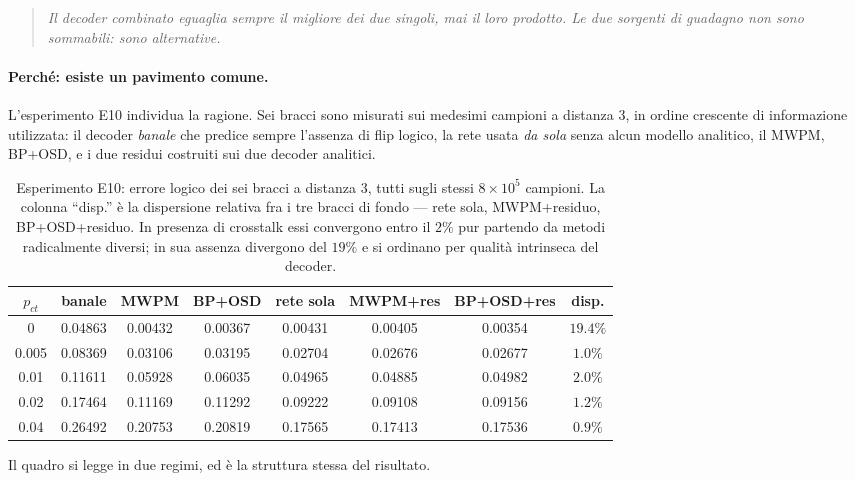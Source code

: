 \begin{quote}
\emph{Il decoder combinato eguaglia sempre il migliore dei due singoli, mai il loro prodotto. Le due sorgenti di guadagno non sono sommabili: sono alternative.}
\end{quote}

\paragraph{Perché: esiste un pavimento comune.}
L'esperimento E10 individua la ragione. Sei bracci sono misurati sui medesimi campioni a distanza 3, in ordine crescente di informazione utilizzata: il decoder \emph{banale} che predice sempre l'assenza di flip logico, la rete usata \emph{da sola} senza alcun modello analitico, il \ac{MWPM}, BP+OSD, e i due residui costruiti sui due decoder analitici.

\begin{table}[H]
\centering
\scriptsize
\begin{tabular}{c ccc ccc c}
\toprule
$p_{ct}$ & \textbf{banale} & \textbf{MWPM} & \textbf{BP+OSD} & \textbf{rete sola} & \textbf{MWPM+res} & \textbf{BP+OSD+res} & \textbf{disp.} \\
\midrule
0     & 0.04863 & 0.00432 & 0.00367 & 0.00431 & 0.00405 & 0.00354 & $19.4\%$ \\
0.005 & 0.08369 & 0.03106 & 0.03195 & 0.02704 & 0.02676 & 0.02677 & $1.0\%$ \\
0.01  & 0.11611 & 0.05928 & 0.06035 & 0.04965 & 0.04885 & 0.04982 & $2.0\%$ \\
0.02  & 0.17464 & 0.11169 & 0.11292 & 0.09222 & 0.09108 & 0.09156 & $1.2\%$ \\
0.04  & 0.26492 & 0.20753 & 0.20819 & 0.17565 & 0.17413 & 0.17536 & $0.9\%$ \\
\bottomrule
\end{tabular}
\caption[Sei decoder, un solo pavimento]{Esperimento E10: errore logico dei sei bracci a distanza 3, tutti sugli stessi $8\times10^5$ campioni. La colonna ``disp.'' è la dispersione relativa fra i tre bracci di fondo --- rete sola, \ac{MWPM}+residuo, BP+OSD+residuo. In presenza di crosstalk essi convergono entro il $2\%$ pur partendo da metodi radicalmente diversi; in sua assenza divergono del $19\%$ e si ordinano per qualità intrinseca del decoder.}
\label{tab:neural_pavimento}
\end{table}

Il quadro si legge in due regimi, ed è la struttura stessa del risultato.


